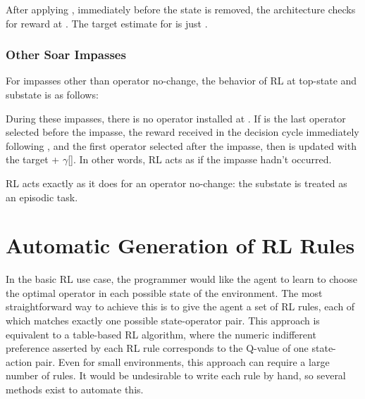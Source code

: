 \begin{list}{S2}
\item After applying , immediately before the state  is removed, the architecture checks for reward  at . The target estimate for  is just .

\end{list}

\subsubsection{Other Soar Impasses}
For impasses other than operator no-change, the behavior of RL at top-state  and substate  is as follows:

\begin{list}{S1}
\item During these impasses, there is no operator installed at .  If  is the last operator selected before the impasse,  the reward received in the decision cycle immediately following , and  the first operator selected after the impasse, then  is updated with the target  + $\gamma$[]. In other words, RL acts as if the impasse hadn't occurred.
\end{list}

\begin{list}{S2}
\item RL acts exactly as it does for an operator no-change: the substate is treated as an episodic task.

\end{list}

\section{Automatic Generation of RL Rules}

In the basic RL use case, the programmer would like the agent to learn to choose the optimal operator in each possible state of the environment.
The most straightforward way to achieve this is to give the agent a set of RL rules, each of which matches exactly one possible state-operator pair.
This approach is equivalent to a table-based RL algorithm, where the numeric indifferent preference asserted by each RL rule corresponds to the Q-value of one state-action pair.
Even for small environments, this approach can require a large number of rules.
It would be undesirable to write each rule by hand, so several methods exist to automate this.

